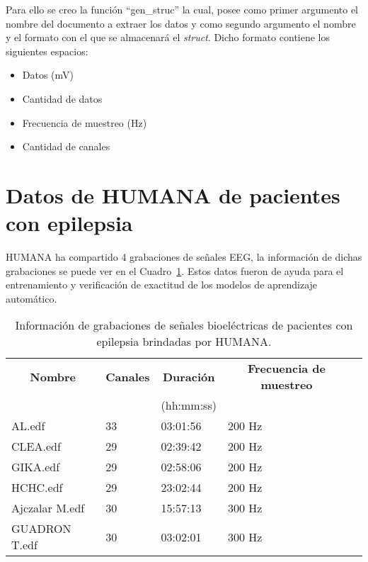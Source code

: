 Para ello se creo la función ``gen\_struc'' la cual, posee como primer argumento el nombre del documento a extraer los datos y como segundo argumento el nombre y el formato con el que se almacenará el \textit{struct}. Dicho formato contiene los siguientes espacios:
\begin{itemize}
    \item Datos (mV)
    \item Cantidad de datos
    \item \gls{Frecuencia de muestreo} (Hz)
    \item Cantidad de canales
\end{itemize}

\section{Datos de HUMANA de pacientes con epilepsia }
HUMANA ha compartido 4 grabaciones de señales EEG, la información de dichas grabaciones se puede ver en el Cuadro~\ref{cuadro:tabla_edf_info}. Estos datos fueron de ayuda para el entrenamiento y verificación de exactitud de los modelos de aprendizaje automático. 

\begin{table}[H]
\begin{center}    
    \begin{tabular}{|l|l|l|l|l|}
    \hline
    \multicolumn{1}{|c|}{\textbf{Nombre}} & \multicolumn{1}{c|}{\textbf{Canales}} & \multicolumn{1}{c|}{\textbf{Duración}} & \multicolumn{1}{c|}{\textbf{Frecuencia de muestreo}}\\ %
          &  & (hh:mm:ss) & \\ \hline
    AL.edf  & 33  & 03:01:56 & 200 Hz   \\ \hline
    CLEA.edf& 29  & 02:39:42 & 200 Hz   \\ \hline
    GIKA.edf& 29  & 02:58:06 & 200 Hz   \\ \hline
    HCHC.edf& 29  & 23:02:44 & 200 Hz   \\ \hline
    Ajczalar M.edf& 30  & 15:57:13 & 300 Hz   \\ \hline
    GUADRON T.edf& 30  & 03:02:01 & 300 Hz   \\ \hline
    \end{tabular}
    \caption[Información de grabaciones dadas por HUMANA]{Información de grabaciones de señales bioeléctricas de pacientes con epilepsia brindadas por HUMANA.} 
    \label{cuadro:tabla_edf_info}
\end{center}
\end{table}

